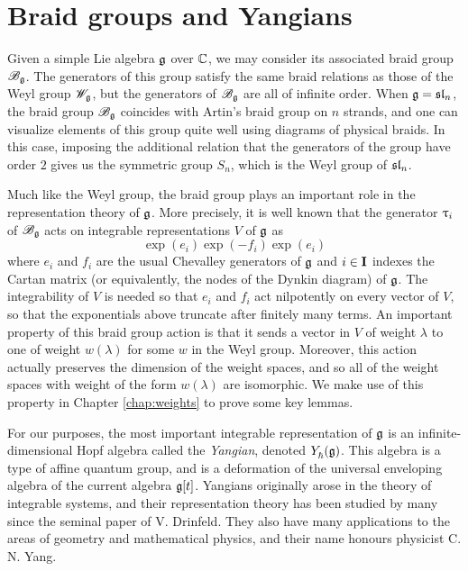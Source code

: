 \section{Braid groups and Yangians}

Given a simple Lie algebra $\mathfrak{g}$ over $\mathbb{C}$, we may consider its associated braid group $\mathscr{B}_{\mathfrak{g}}$.
The generators of this group satisfy the same braid relations as those of the Weyl group $\mathscr{W}_{\mathfrak{g}}$, but the generators of $\mathscr{B}_{\mathfrak{g}}$ are all of infinite order.
When $\mathfrak{g} = \mathfrak{sl}_n$, the braid group $\mathscr{B}_{\mathfrak{g}}$ coincides with Artin's braid group on $n$ strands, and one can visualize elements of this group quite well using diagrams of physical braids.
In this case, imposing the additional relation that the generators of the group have order $2$ gives us the symmetric group $S_n$, which is the Weyl group of $\mathfrak{sl}_n$.

Much like the Weyl group, the braid group plays an important role in the representation theory of $\mathfrak{g}$.
More precisely, it is well known that the generator $\uptau_i$ of $\mathscr{B}_{\mathfrak{g}}$ acts on integrable representations $V$ of $\mathfrak{g}$ as
\[\exp(e_i)\exp(-f_i)\exp(e_i)\]
where $e_i$ and $f_i$ are the usual Chevalley generators of $\mathfrak{g}$ and $i\in\mathbf{I}$ indexes the Cartan matrix (or equivalently, the nodes of the Dynkin diagram) of $\mathfrak{g}$.
The integrability of $V$ is needed so that $e_i$ and $f_i$ act nilpotently on every vector of $V$, so that the exponentials above truncate after finitely many terms.
An important property of this braid group action is that it sends a vector in $V$ of weight $\lambda$ to one of weight $w(\lambda)$ for some $w$ in the Weyl group.
Moreover, this action actually preserves the dimension of the weight spaces, and so all of the weight spaces with weight of the form $w(\lambda)$ are isomorphic.
We make use of this property in Chapter \ref{chap:weights} to prove some key lemmas.

For our purposes, the most important integrable representation of $\mathfrak{g}$ is an infinite-dimensional Hopf algebra called the \emph{Yangian}, denoted $Y_\hbar^{}(\mathfrak{g})$.
This algebra is a type of affine quantum group, and is a deformation of the universal enveloping algebra of the current algebra $\mathfrak{g}[t]$.
Yangians originally arose in the theory of integrable systems, and their representation theory has been studied by many since the seminal paper \cite{drinfeld_hopf_1985} of V. Drinfeld.
They also have many applications to the areas of geometry and mathematical physics, and their name honours physicist C. N. Yang.

